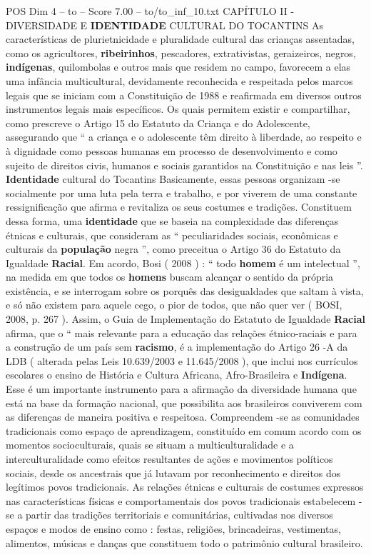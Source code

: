 \begin{textsample}{POS Dim 4 – to – Score 7.00 – to/to\_inf\_10.txt}  \label{ex:f4_pos_208}
CAPÍTULO II - DIVERSIDADE E \textbf{IDENTIDADE} CULTURAL DO TOCANTINS As características de plurietnicidade e pluralidade cultural das crianças assentadas, como os agricultores, \textbf{ribeirinhos}, pescadores, extrativistas, geraizeiros, negros, \textbf{indígenas}, quilombolas e outros mais que residem no campo, favorecem a elas uma infância multicultural, devidamente reconhecida e respeitada pelos marcos legais que se iniciam com a Constituição de 1988 e reafirmada em diversos outros instrumentos legais mais específicos.
Os quais permitem existir e compartilhar, como prescreve o Artigo 15 do Estatuto da Criança e do Adolescente, assegurando que “ a criança e o adolescente têm direito à liberdade, ao respeito e à dignidade como pessoas humanas em processo de desenvolvimento e como sujeito de direitos civis, humanos e sociais garantidos na Constituição e nas leis ”. \textbf{Identidade} cultural do Tocantins Basicamente, essas pessoas organizam -se socialmente por uma luta pela terra e trabalho, e por viverem de uma constante ressignificação que afirma e revitaliza os seus costumes e tradições.
Constituem dessa forma, uma \textbf{identidade} que se baseia na complexidade das diferenças étnicas e culturais, que consideram as “ peculiaridades sociais, econômicas e culturais da \textbf{população} negra ”, como preceitua o Artigo 36 do Estatuto da Igualdade \textbf{Racial}.
Em acordo, Bosi ( 2008 ) : “ todo \textbf{homem} é um intelectual ”, na medida em que todos os \textbf{homens} buscam alcançar o sentido da própria existência, e se interrogam sobre os porquês das desigualdades que saltam à vista, e só não existem para aquele cego, o pior de todos, que não quer ver ( BOSI, 2008, p. 267 ).
Assim, o Guia de Implementação do Estatuto de Igualdade \textbf{Racial} afirma, que o “ mais relevante para a educação das relações étnico-raciais e para a construção de um país sem \textbf{racismo}, é a implementação do Artigo 26 -A da LDB ( alterada pelas Leis 10.639/2003 e 11.645/2008 ), que inclui nos currículos escolares o ensino de História e Cultura Africana, Afro-Brasileira e \textbf{Indígena}.
Esse é um importante instrumento para a afirmação da diversidade humana que está na base da formação nacional, que possibilita aos brasileiros conviverem com as diferenças de maneira positiva e respeitosa.
Compreendem -se as comunidades tradicionais como espaço de aprendizagem, constituído em comum acordo com os momentos socioculturais, quais se situam a multiculturalidade e a interculturalidade como efeitos resultantes de ações e movimentos políticos sociais, desde os ancestrais que já lutavam por reconhecimento e direitos dos legítimos povos tradicionais.
As relações étnicas e culturais de costumes expressos nas características físicas e comportamentais dos povos tradicionais estabelecem -se a partir das tradições territoriais e comunitárias, cultivadas nos diversos espaços e modos de ensino como : festas, religiões, brincadeiras, vestimentas, alimentos, músicas e danças que constituem todo o patrimônio cultural brasileiro.

\end{textsample}
